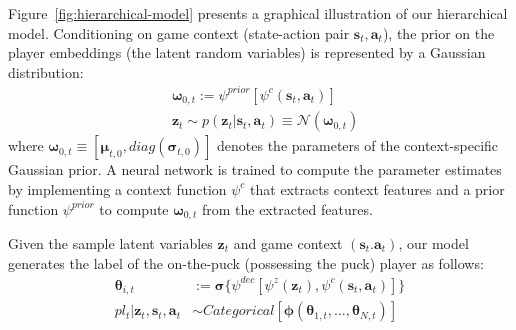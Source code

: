 \documentclass[letterpaper]{article} %
\newcommand{\context}{c}
\newcommand{\expect}{\mathbb{E}}
\newcommand{\latentvariables}{\mathbf{z}}
\newcommand{\state}{\mathbf{s}}
\newcommand{\action}{\mathbf{a}}
\newcommand{\player}{pl}
\newcommand{\pindex}{i}
\newcommand{\softmax}{\boldsymbol{\phi}}
\newcommand{\sigmoid}{\boldsymbol{\sigma}}
\newcommand{\GaussianParameters}{\boldsymbol{\omega}}
\newcommand{\BernoulliParameters}{\boldsymbol{\theta}}
\begin{document}
Figure~\ref{fig:hierarchical-model} presents a graphical illustration of our hierarchical model.
Conditioning on game context (state-action pair  $\state_{t},\action_{t}$), the prior on the player embeddings (the latent random variables) is represented by a Gaussian distribution:
\begin{align}
    &\boldsymbol{\GaussianParameters}_{0,t} :=\psi^{prior}[\psi^{\context}(\state_{t},\action_{t})]\\
    &\latentvariables_{t}\sim p(\latentvariables_{t}|\state_{t},\action_{t}) \equiv \mathcal{N}(\boldsymbol{\GaussianParameters}_{0,t})\label{eqn:prior}
\end{align}
where $\GaussianParameters_{0,t}\equiv[\boldsymbol{\mu}_{t,0},diag(\boldsymbol{\sigma}_{t,0})]$ denotes the parameters of the context-specific Gaussian prior. 
A neural network is trained to compute the parameter estimates by implementing 
a context function $\psi^{\context}$ that extracts context features and a prior function $\psi^{prior}$ to compute $\boldsymbol{\GaussianParameters}_{0,t}$ from the extracted features. 

Given the sample latent variables $\latentvariables_{t}$ and game context $(\state_{t}.\action_{t})$, our model generates the label of the on-the-puck (possessing the puck) player as follows:  
\begin{align}
    \BernoulliParameters_{\pindex,t}&:=\sigmoid\{\psi^{dec}[\psi^{z}(\latentvariables_{t}), \psi^{\context}(\state_{t},\action_{t})]\} \\
    \player_{t}| \latentvariables_{t}, \state_{t},\action_{t} &\sim Categorical[\softmax(\BernoulliParameters_{1,t},\dots,\BernoulliParameters_{N,t})]
\end{align}
\end{document}
